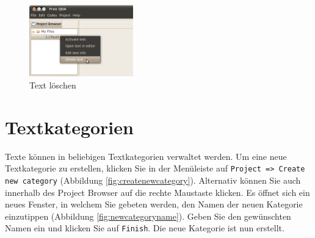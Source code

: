 \begin{figure}[!htb]
	\centering
	 \includegraphics[width=0.4\textwidth]{img/deletetext}
	\caption{Text löschen}
	\label{fig:deletetext}
\end{figure}


\section{Textkategorien}
\label{sec:textcategory}
Texte können in beliebigen Textkategorien verwaltet werden. Um eine neue Textkategorie zu erstellen, klicken Sie in der Menüleiste auf %
\texttt{Project => Create new category} (Abbildung \ref{fig:createnewcategory}). Alternativ können Sie auch innerhalb des Project Browser %
auf die rechte Maustaste klicken. Es öffnet sich ein neues Fenster, in welchem Sie gebeten werden, den Namen der neuen Kategorie %
einzutippen (Abbildung \ref{fig:newcategoryname}). Geben Sie den gewünschten Namen ein und klicken Sie auf \texttt{Finish}. Die neue Kategorie ist nun erstellt.

